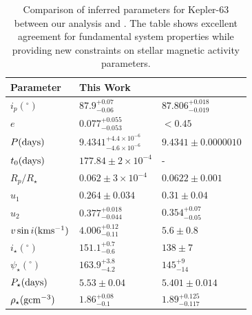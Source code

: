 \documentclass[twocolumn]{aastex631}
\begin{document}
%
\begin{table}[]
    \vspace{0.5cm}
    \centering
    \caption{Comparison of inferred parameters for Kepler-63 between our analysis and \cite{Sanchis2013}. The table shows excellent agreement for fundamental system properties while providing new constraints on stellar magnetic activity parameters.}
    \begin{tabular}{lll}
    \hline
    Parameter                                 & This Work    & \cite{Sanchis2013} \\ \hline\hline
    $i_p (^\circ)$                            & $87.9^{+0.07}_{-0.06}$                             & $87.806^{+0.018}_{-0.019}$                    \\
    $e$                                       & $0.077^{+0.055}_{-0.053}$                          & $<0.45$                     \\
    $P (\rm days)$                            & $9.4341^{+4.4\times10^{-6}}_{-4.6\times10^{-6}}$   & $9.4341\pm 0.0000010$                   \\
    $t_0 (\rm days)$                          & $177.84\pm 2\times 10^{-4}$                        &    -                 \\
    $R_p / R_\star$                           & $0.062 \pm 3\times10^{-4}$                         &  $0.0622\pm 0.001$                   \\ 
    $u_1$                                     & $0.264 \pm 0.034$                                  &  $0.31 \pm 0.04$                   \\ 
    $u_2$                                     & $0.377^{+0.018}_{-0.044}$                          &  $0.354^{+0.07}_{-0.05}$                   \\ 
    $v\sin i (\rm kms^{-1})$                  & $4.006^{+0.12}_{-0.11}$                            & $5.6\pm 0.8$                    \\ \hline
    $i_\star (^\circ)$                        & $151.1^{+0.7}_{-0.6}$                              &  $138\pm 7$                    \\
    $\psi_\star (^\circ)$                     & $163.9^{+3.8}_{-4.2}$                              &  $145^{+9}_{-14}$                   \\
    $P_\star (\rm days)$                      & $5.53\pm 0.04$                                     & $5.401\pm 0.014$                    \\ 
    $\rho_\star (\rm gcm^{-3})$               & $1.86^{+0.08}_{-0.1}$                              & $1.89^{+0.125}_{-0.117}$                    \\ \hline

\end{tabular}
\end{table}
\end{document}
